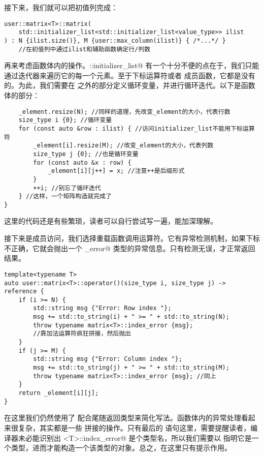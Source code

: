 接下来，我们就可以把初值列完成：
\begin{lstlisting}
user::matrix<T>::matrix(
    std::initializer_list<std::initializer_list<value_type>> ilist
) : N {ilist.size()}, M {user::max_column(ilist)} { /*...*/ }
    //在初值列中通过ilist和辅助函数确定行/列数
\end{lstlisting}\par
再来考虑函数体内的操作。\lstinline@std::initializer_list@ 有一个十分不便的点在于，我们只能通过迭代器来遍历它的每一个元素。至于下标运算符或者 \lstinline@at@ 成员函数，它都是没有的。为此，我们需要在 \lstinline@for@ 之外的部分定义循环变量，并进行循环迭代。以下是函数体的部分：
\begin{lstlisting}
    _element.resize(N); //同样的道理，先改变_element的大小，代表行数
    size_type i {0}; //循环变量
    for (const auto &row : ilist) { //访问initializer_list不能用下标运算符
        _element[i].resize(M); //改变_element的大小，代表列数
        size_type j {0}; //也是循环变量
        for (const auto &x : row) {
            _element[i][j++] = x; //注意++是后缀形式
        }
        ++i; //别忘了循环迭代
    } //这样，一个矩阵构造就完成了
}
\end{lstlisting}
这里的代码还是有些繁琐，读者可以自行尝试写一遍，能加深理解。\par
接下来是成员访问，我们选择重载函数调用运算符。它有异常检测机制，如果下标不正确，它就会抛出一个 \lstinline@index_error@ 类型的异常信息。只有检测无误，才正常返回结果。
\begin{lstlisting}
template<typename T>
auto user::matrix<T>::operator()(size_type i, size_type j) -> reference {
    if (i >= N) {
        std::string msg {"Error: Row index "};
        msg += std::to_string(i) + " >= " + std::to_string(N);
        throw typename matrix<T>::index_error {msg};
        //靠加法运算符疯狂拼接，然后抛出
    }
    if (j >= M) {
        std::string msg {"Error: Column index "};
        msg += std::to_string(j) + " >= " + std::to_string(M);
        throw typename matrix<T>::index_error {msg}; //同上
    }
    return _element[i][j];
}
\end{lstlisting}
在这里我们仍然使用了 \lstinline@auto@ 配合尾随返回类型来简化写法。函数体内的异常处理看起来很复杂，其实都是一些 \lstinline@string@ 拼接的操作。只有最后的 \lstinline@throw@ 语句这里，需要提醒读者，编译器未必能识别出 \lstinline@matrix<T>::index_error@ 是个类型名，所以我们需要以 \lstinline@typename@ 指明它是一个类型，进而才能构造一个该类型的对象。总之，\lstinline@typename@ 在这里只有提示作用。\par

